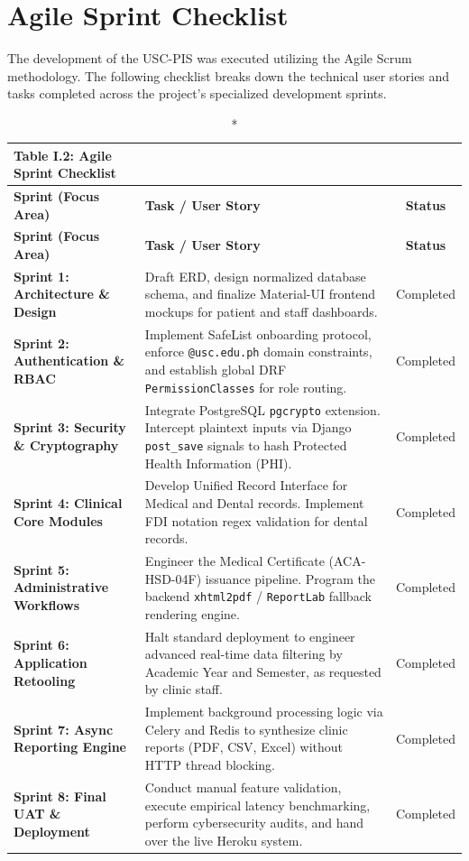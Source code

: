 \section{Agile Sprint Checklist}
The development of the USC-PIS was executed utilizing the Agile Scrum methodology. The following checklist breaks down the technical user stories and tasks completed across the project's specialized development sprints.

\begin{longtable}{|p{3.5cm}|p{8cm}|c|}
\caption*{Table I.2: Agile Sprint Checklist} \\
\hline
\textbf{Sprint (Focus Area)} & \textbf{Task / User Story} & \textbf{Status} \\
\hline
\endfirsthead
\hline
\textbf{Sprint (Focus Area)} & \textbf{Task / User Story} & \textbf{Status} \\
\hline
\endhead
\hline
\endfoot
\textbf{Sprint 1: Architecture \& Design} & Draft ERD, design normalized database schema, and finalize Material-UI frontend mockups for patient and staff dashboards. & Completed \\
\hline
\textbf{Sprint 2: Authentication \& RBAC} & Implement SafeList onboarding protocol, enforce \texttt{@usc.edu.ph} domain constraints, and establish global DRF \texttt{PermissionClasses} for role routing. & Completed \\
\hline
\textbf{Sprint 3: Security \& Cryptography} & Integrate PostgreSQL \texttt{pgcrypto} extension. Intercept plaintext inputs via Django \texttt{post\_save} signals to hash Protected Health Information (PHI). & Completed \\
\hline
\textbf{Sprint 4: Clinical Core Modules} & Develop Unified Record Interface for Medical and Dental records. Implement FDI notation regex validation for dental records. & Completed \\
\hline
\textbf{Sprint 5: Administrative Workflows} & Engineer the Medical Certificate (ACA-HSD-04F) issuance pipeline. Program the backend \texttt{xhtml2pdf} / \texttt{ReportLab} fallback rendering engine. & Completed \\
\hline
\textbf{Sprint 6: Application Retooling} & Halt standard deployment to engineer advanced real-time data filtering by Academic Year and Semester, as requested by clinic staff. & Completed \\
\hline
\textbf{Sprint 7: Async Reporting Engine} & Implement background processing logic via Celery and Redis to synthesize clinic reports (PDF, CSV, Excel) without HTTP thread blocking. & Completed \\
\hline
\textbf{Sprint 8: Final UAT \& Deployment} & Conduct manual feature validation, execute empirical latency benchmarking, perform cybersecurity audits, and hand over the live Heroku system. & Completed \\
\hline
\end{longtable}

